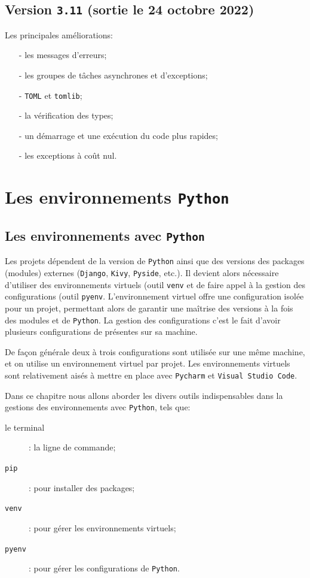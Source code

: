 \documentclass[a4paper,11pt]{book}
\begin{document}
\section{Version \texttt{3.11} (sortie le 24 octobre 2022)}
Les principales améliorations:
\begin{itemize}
	\item[-] les messages d'erreurs;
	\item[-] les groupes de tâches asynchrones et d'exceptions;
	\item[-] \texttt{TOML} et \texttt{tomlib};
	\item[-] la vérification des types;
	\item[-] un démarrage et une exécution du code plus rapides;
	\item[-] les exceptions à coût nul.
\end{itemize}
\medskip

\chapter{Les environnements \texttt{Python}}
\section{Les environnements avec \texttt{Python}}
Les projets dépendent de la version de \texttt{Python} ainsi que des versions des packages (modules) externes (\texttt{Django}, \texttt{Kivy}, \texttt{Pyside}, etc.). Il devient alors nécessaire d'utiliser des environnements virtuels (outil \texttt{venv} et de faire appel à la gestion des configurations (outil \texttt{pyenv}. L'environnement virtuel offre une configuration isolée pour un projet, permettant alors de garantir une maîtrise des versions à la fois des modules et de \texttt{Python}. La gestion des configurations c'est le fait d'avoir plusieurs configurations de présentes sur sa machine.
\medskip

De façon générale deux à trois configurations sont utilisée sur une même machine, et  on utilise  un environnement virtuel par projet. Les environnements virtuels sont relativement aisés à mettre en place  avec \texttt{Pycharm} et \texttt{Visual Studio Code}.
\medskip

Dans ce chapitre nous allons aborder les divers outils indispensables dans la gestions des environnements avec \texttt{Python}, tels que:
\begin{description}
	\item[le terminal]: la ligne de commande;
	\item[\texttt{pip}]: pour installer des packages;
	\item[\texttt{venv}]: pour gérer les environnements virtuels;
	\item[\texttt{pyenv}]: pour gérer les configurations de \texttt{Python}.
\end{description}
\medskip
\end{document}
